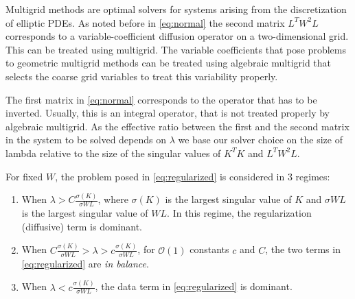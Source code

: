 Multigrid methods are optimal solvers for systems arising from the
discretization of elliptic PDEs. As noted before in \eqref{eq:normal}
the second matrix $L^T W^2 L$ corresponds to a variable-coefficient
diffusion operator on a two-dimensional grid. This can be treated
using multigrid. The variable coefficients that pose problems to
geometric multigrid methods can be treated using algebraic multigrid
that selects the coarse grid variables to treat this variability properly.

The first matrix in \eqref{eq:normal} corresponds to the operator that
has to be inverted. Usually, this is an integral operator, that is not
treated properly by algebraic multigrid. As the effective ratio
between the first and the second matrix in the system to be solved
depends on $\lambda$ we base our solver choice on the size of lambda
relative to the size of the singular values of $K^T K$ and $L^T W^2
L$.

For fixed $W$, the problem posed in \eqref{eq:regularized} is considered in 3 regimes:
\begin{enumerate}
\item When $\lambda > C \frac{\sigma(K)}{\sigma{WL}}$, where
  $\sigma(K)$ is the largest singular value of $K$ and $\sigma{WL}$ is
  the largest singular value of $WL$.  In this regime, the
  regularization (diffusive) term is dominant.
\item When $C \frac{\sigma(K)}{\sigma{WL}} > \lambda > c
  \frac{\sigma(K)}{\sigma{WL}}$, for $\mathcal{O}(1)$ constants $c$
  and $C$, the two terms in \eqref{eq:regularized} are {\it in
    balance}.
\item When $\lambda < c \frac{\sigma(K)}{\sigma{WL}}$, the data term
  in \eqref{eq:regularized} is dominant.
\end{enumerate}

